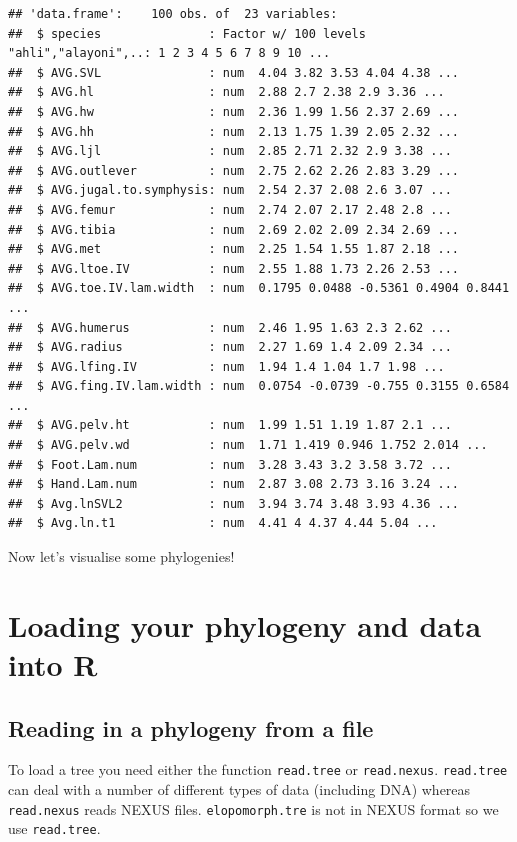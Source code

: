 \documentclass[]{book}
\begin{document}
\begin{verbatim}
## 'data.frame':    100 obs. of  23 variables:
##  $ species               : Factor w/ 100 levels "ahli","alayoni",..: 1 2 3 4 5 6 7 8 9 10 ...
##  $ AVG.SVL               : num  4.04 3.82 3.53 4.04 4.38 ...
##  $ AVG.hl                : num  2.88 2.7 2.38 2.9 3.36 ...
##  $ AVG.hw                : num  2.36 1.99 1.56 2.37 2.69 ...
##  $ AVG.hh                : num  2.13 1.75 1.39 2.05 2.32 ...
##  $ AVG.ljl               : num  2.85 2.71 2.32 2.9 3.38 ...
##  $ AVG.outlever          : num  2.75 2.62 2.26 2.83 3.29 ...
##  $ AVG.jugal.to.symphysis: num  2.54 2.37 2.08 2.6 3.07 ...
##  $ AVG.femur             : num  2.74 2.07 2.17 2.48 2.8 ...
##  $ AVG.tibia             : num  2.69 2.02 2.09 2.34 2.69 ...
##  $ AVG.met               : num  2.25 1.54 1.55 1.87 2.18 ...
##  $ AVG.ltoe.IV           : num  2.55 1.88 1.73 2.26 2.53 ...
##  $ AVG.toe.IV.lam.width  : num  0.1795 0.0488 -0.5361 0.4904 0.8441 ...
##  $ AVG.humerus           : num  2.46 1.95 1.63 2.3 2.62 ...
##  $ AVG.radius            : num  2.27 1.69 1.4 2.09 2.34 ...
##  $ AVG.lfing.IV          : num  1.94 1.4 1.04 1.7 1.98 ...
##  $ AVG.fing.IV.lam.width : num  0.0754 -0.0739 -0.755 0.3155 0.6584 ...
##  $ AVG.pelv.ht           : num  1.99 1.51 1.19 1.87 2.1 ...
##  $ AVG.pelv.wd           : num  1.71 1.419 0.946 1.752 2.014 ...
##  $ Foot.Lam.num          : num  3.28 3.43 3.2 3.58 3.72 ...
##  $ Hand.Lam.num          : num  2.87 3.08 2.73 3.16 3.24 ...
##  $ Avg.lnSVL2            : num  3.94 3.74 3.48 3.93 4.36 ...
##  $ Avg.ln.t1             : num  4.41 4 4.37 4.44 5.04 ...
\end{verbatim}

Now let's visualise some phylogenies!

\section{Loading your phylogeny and data into
R}\label{loading-your-phylogeny-and-data-into-r}

\subsection{Reading in a phylogeny from a
file}\label{reading-in-a-phylogeny-from-a-file}

To load a tree you need either the function \texttt{read.tree} or
\texttt{read.nexus}. \texttt{read.tree} can deal with a number of
different types of data (including DNA) whereas \texttt{read.nexus}
reads NEXUS files. \texttt{elopomorph.tre} is not in NEXUS format so we
use \texttt{read.tree}.
\end{document}
